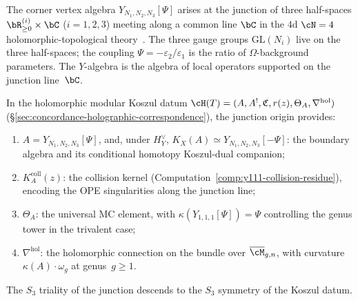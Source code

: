 \begin{remark}%
\label{rem:y-junction}
The corner vertex algebra $Y_{N_1,N_2,N_3}[\Psi]$ arises at
the junction of three half-spaces
$\bR_{\geq 0}^{(i)} \times \bC$ ($i = 1,2,3$) meeting along a
common line $\bC$ in the $4$d $\cN = 4$ holomorphic-topological
theory~\cite{gaiotto-rapchak}. The three gauge groups
$\mathrm{GL}(N_i)$ live on the three half-spaces; the coupling
$\Psi = -\varepsilon_2/\varepsilon_1$ is the ratio of
$\Omega$-background parameters. The $Y$-algebra is the algebra
of local operators supported on the junction line~$\bC$.

In the holomorphic modular Koszul datum
$\cH(T) = (A, A^!, \mathfrak{C}, r(z), \Theta_A, \nabla^{\mathrm{hol}})$
(\S\ref{sec:concordance-holographic-correspondence}), the junction
origin provides:
\begin{enumerate}[label=\textup{(\roman*)},nosep]
\item $A = Y_{N_1,N_2,N_3}[\Psi]$,
 and, under \(H_Y^\vee\),
 \(K_X(A)\simeq Y_{N_1,N_2,N_3}[-\Psi]\): the boundary algebra and
 its conditional homotopy Koszul-dual companion;
\item $K_A^{\mathrm{coll}}(z)$: the collision kernel
 (Computation~\ref{comp:y111-collision-residue}), encoding the
 OPE singularities along the junction line;
\item $\Theta_A$: the universal MC element, with
 $\kappa(Y_{1,1,1}[\Psi])=\Psi$ controlling the genus tower in the
 trivalent case;
\item $\nabla^{\mathrm{hol}}$: the holomorphic connection on the
 bundle over $\overline{\cM}_{g,n}$, with curvature
 $\kappa(A) \cdot \omega_g$ at genus~$g \geq 1$.
\end{enumerate}
The $S_3$ triality of the junction descends to the $S_3$
symmetry of the Koszul datum.
\end{remark}
